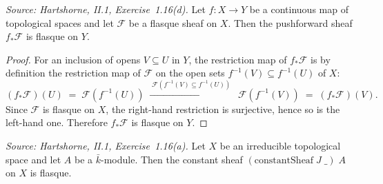 \begin{lemma}

  \label{lem:isFlasque_pushforward}
  \textit{Source: Hartshorne, II.1, Exercise~1.16(d).}
  Let \(f \colon X \to Y\) be a continuous map of topological spaces and
  let \(\mathcal F\) be a flasque sheaf on \(X\). Then the pushforward
  sheaf \(f_*\mathcal F\) is flasque on \(Y\).
\end{lemma}

\begin{proof}
  \leanok
  For an inclusion of opens \(V \subseteq U\) in \(Y\), the restriction
  map of \(f_*\mathcal F\) is by definition the restriction map of
  \(\mathcal F\) on the open sets \(f^{-1}(V) \subseteq f^{-1}(U)\) of
  \(X\):
  \[
    (f_*\mathcal F)(U) \;=\; \mathcal F(f^{-1}(U))
    \;\xrightarrow{\;\mathcal F(f^{-1}(V) \subseteq f^{-1}(U))\;}\;
    \mathcal F(f^{-1}(V)) \;=\; (f_*\mathcal F)(V).
  \]
  Since \(\mathcal F\) is flasque on \(X\), the right-hand restriction is
  surjective, hence so is the left-hand one. Therefore \(f_*\mathcal F\)
  is flasque on \(Y\).
\end{proof}

\begin{lemma}

  \label{lem:isFlasque_constant_irreducible}
  \textit{Source: Hartshorne, II.1, Exercise~1.16(a).}
  Let \(X\) be an irreducible topological space and let \(A\) be a
  \(\bar k\)-module. Then the constant sheaf
  \((\mathrm{constantSheaf}\;J\;\_)\;A\) on \(X\) is flasque.
\end{lemma}

